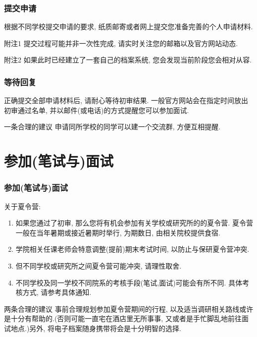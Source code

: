 \documentclass[usenames,dvipsnames]{beamer}
\begin{document}
    \begin{frame}
      \frametitle{提交申请}
      根据不同学校提交申请的要求, 纸质邮寄或者网上提交您准备完善的个人申请材料.
      \begin{block}{附注1}
        提交过程可能并非一次性完成, 请实时关注您的邮箱以及官方网站动态.
      \end{block}
      \begin{block}{附注2}
        如果此时已经建立了一套自己的档案系统, 您会发现当前阶段您会相对从容.
      \end{block}
    \end{frame}

    \begin{frame}
      \frametitle{等待回复}
        正确提交全部申请材料后, 请耐心等待初审结果. 一般官方网站会在指定时间放出初审通过名单, 并以邮件(或电话)的方式提醒您可以参加面试.
      \begin{block}{一条合理的建议}
        申请同所学校的同学可以建一个交流群, 方便互相提醒.  
      \end{block}
    \end{frame}

    \section{参加(笔试与)面试} 
    
    \begin{frame}
      \frametitle{参加(笔试与)面试}
      关于夏令营:
      \begin{enumerate}[label=--]
        \item 如果您通过了初审, 那么您将有机会参加有关学校或研究所的的夏令营. 夏令营一般在当年暑期或接近暑期时举行, 为期数日, 由相关院校提供食宿.
        \item 学院相关任课老师会特意调整(提前)期末考试时间, 以防止与保研夏令营冲突.
        \item 但不同学校或研究所之间夏令营可能冲突, 请理性取舍.
        \item 不同学校及同一学校不同院系的考核手段(笔试,面试)可能会有所不同. 具体考核方式, 请参考具体通知.
      \end{enumerate}
      \begin{block}{两条合理的建议}
        \small
        事前合理规划参加夏令营期间的行程, 以及适当调研相关路线或许是十分有帮助的.(否则可能一直宅在酒店里无所事事, 又或者是手忙脚乱地前往面试地点.)另外, 将电子档案随身携带将会是十分明智的选择.
      \end{block}
    \end{frame}
\end{document}
